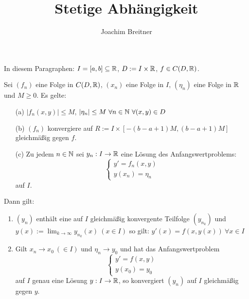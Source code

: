 \documentclass{article}
\title{Stetige Abhängigkeit}
\author{Joachim Breitner}
\begin{document}
\maketitle

In diesem Paragraphen: $I = [a,b]\subseteq \mathbb{R}$, $D:= I\times \mathbb{R}$, $f\in C(D,\mathbb{R})$.

\begin{satz}
Sei $(f_n)$ eine Folge in $C(D,\mathbb{R})$, $(x_n)$ eine Folge in $I$, $(\eta_n)$ eine Folge in $\mathbb{R}$ und $M\ge 0$. Es gelte:
\begin{enumerate}
\item[(a)] $|f_n(x,y)| \le M$, $|\eta_n|\le M\ \forall n\in\mathbb{N} \ \forall (x,y)\in D$
\item[(b)] $(f_n)$ konvergiere auf $R:= I \times [-(b-a+1)M, (b-a+1)M ]$ gleichmäßig gegen $f$.
\item[(c)] Zu jedem $n\in\mathbb{N}$ sei $y_n: I \to \mathbb{R}$ eine Lösung des Anfangswertproblems:
\[ \begin{cases} y'=f_n(x,y) \\ y(x_n) = \eta_n \end{cases} \]
auf $I$.
\end{enumerate}
Dann gilt: 
\begin{enumerate}
\item $(y_n)$ enthält eine auf $I$ gleichmäßig konvergente Teilfolge $(y_{n_k})$ und $y(x) := \lim_{k\to\infty} y_{n_k}(x) \ (x\in I)$ so gilt: $y'(x)  =f(x,y(x))\ \forall x\in I$
\item  Gilt $x_n\to x_0\ (\in I)$ und $\eta_n\to y_0$ und hat das Anfangswertproblem 
\[
\begin{cases}
y'=f(x,y) \\ y(x_0)= y_0
\end{cases}\]
auf $I$ genau eine Lösung $y:I\to\mathbb{R}$, so konvergiert $(y_n)$ auf $I$ gleichmäßig gegen $y$.
\end{enumerate}
\end{satz}
\end{document}
